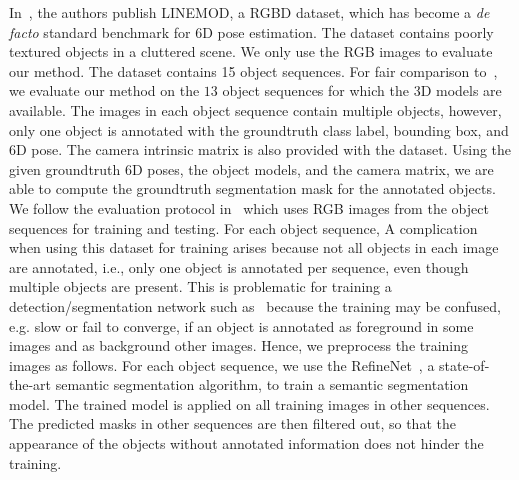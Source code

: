 \documentclass[conference]{IEEEtran}
\newcommand\red[1]{{\color{black}#1}}
\begin{document}
In~\cite{ACCV12}, the authors publish LINEMOD, a RGBD dataset,  which has become a \textit{de facto} standard benchmark for 6D pose estimation. The dataset contains poorly textured objects in a cluttered scene. We only use the RGB images to evaluate our method. The dataset contains 15 object sequences. For fair comparison to~\cite{CVPR16,BB8,SSD-6D}, we evaluate our method on the $13$ object sequences for which the 3D models are available. 
The images in each object sequence contain multiple objects, however, only one object is annotated with the groundtruth class label, bounding box, and 6D pose. The camera intrinsic matrix is also provided with the dataset. Using the given groundtruth 6D poses, the object models, and the camera matrix, we are able to compute the groundtruth segmentation mask for the annotated objects. 
We follow the evaluation protocol in~\cite{CVPR16,BB8} which uses RGB images from the object sequences for training and testing. %
For each object sequence, %
A complication when using this dataset for training arises because  
not all objects in each image are annotated, i.e., only one object is annotated per sequence, even though multiple objects are present. This is problematic for training a detection/segmentation network such as~\cite{Faster-RCNN,Mask-RCNN} because the training may be confused, e.g. slow or fail to converge, if an object is annotated as foreground in some images and as background other images. 
Hence, we preprocess the training images as follows. For each object sequence, we use the RefineNet~\cite{Lin:2017:RefineNet}, a state-of-the-art semantic segmentation algorithm, to train a semantic segmentation model. The trained model is applied on all training images in other sequences. The predicted masks in other sequences are then filtered out, so that the appearance of the objects without annotated information does not hinder the training. 
\end{document}

